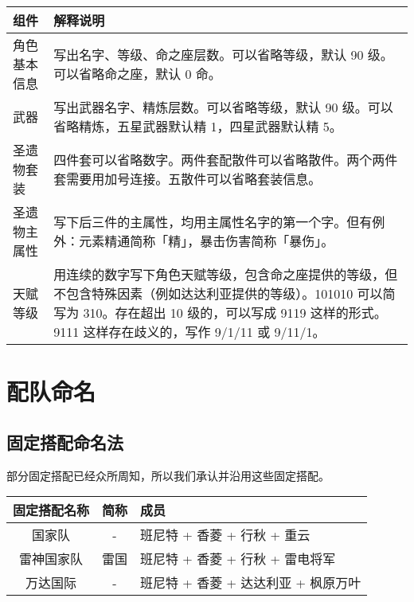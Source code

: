 \begin{tabu} {|l|X|}
	\hline
	{组件}         & {解释说明}                                                                                                                                                                                                          \\
	\hline
	{角色基本信息} & {写出名字、等级、命之座层数。可以省略等级，默认 90 级。可以省略命之座，默认 0 命。}                                                                                                                                 \\
	{武器}         & {写出武器名字、精炼层数。可以省略等级，默认 90 级。可以省略精炼，五星武器默认精 1，四星武器默认精 5。}                                                                                                              \\
	{圣遗物套装}   & {四件套可以省略数字。两件套配散件可以省略散件。两个两件套需要用加号连接。五散件可以省略套装信息。}                                                                                                                  \\
	{圣遗物主属性} & {写下后三件的主属性，均用主属性名字的第一个字。但有例外：元素精通简称「精」，暴击伤害简称「暴伤」。}                                                                                                                             \\
	{天赋等级}     & {用连续的数字写下角色天赋等级，包含命之座提供的等级，但不包含特殊因素（例如达达利亚提供的等级）。101010 可以简写为 310。存在超出 10 级的，可以写成 9119 这样的形式。9111 这样存在歧义的，写作 9/1/11 或 9/11/1。} \\
	\hline
\end{tabu}


\section{配队命名}

\subsection{固定搭配命名法}

部分固定搭配已经众所周知，所以我们承认并沿用这些固定搭配。


\begin{longtabu}{|c|c|X[c]|}
	\hline
	{固定搭配名称} & {简称} & {成员} \\
	\hline
	\endhead
	{国家队} & {-} & {班尼特 + 香菱 + 行秋 + 重云} \\
	{雷神国家队} & {雷国} & {班尼特 + 香菱 + 行秋 + 雷电将军} \\
	{万达国际} & {-} & {班尼特 + 香菱 + 达达利亚 + 枫原万叶} \\
	\hline
\end{longtabu}

